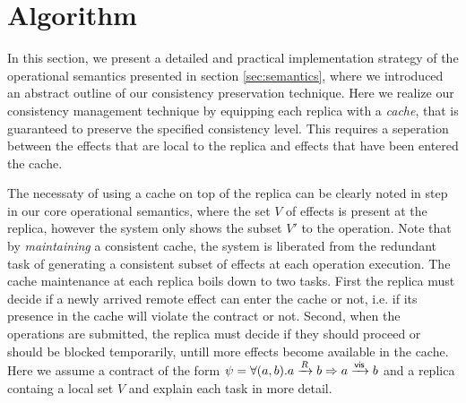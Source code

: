 \section{Algorithm}
%
In this section, we present a detailed and practical implementation
strategy of the operational semantics presented in section \ref{sec:semantics},
where we introduced an abstract outline of our consistency
preservation technique. Here we realize our consistency management technique by equipping 
each replica with a \emph{cache}, that is guaranteed to
preserve the specified consistency level. This requires a seperation
between the effects that are local to the replica and effects that have
been entered the cache. 

The necessaty of using a cache on top of the replica  can be clearly noted 
in \visrule step in our core operational
semantics, where the set $V$ of effects
is present at the replica, however the system only shows the subset $V'$
to the operation. Note
that by \emph{maintaining} a consistent cache, the system is liberated from the
redundant task of generating a consistent subset of effects at each
operation execution.
The cache maintenance at each replica boils down to two tasks. First the
replica must decide if a newly arrived remote effect can enter the
cache or not, i.e. if its presence in the cache will violate the
contract or not.  Second, when the operations are submitted, the replica
must decide if they should proceed or should be blocked temporarily,
untill more effects become available in the cache.  Here we assume a
contract of the form  
$\psi = \forall (a,b). a \xrightarrow{R} b  \Rightarrow a
\xrightarrow{{\normalfont \textsf{vis}}} b$ and a replica containg a local set $V$ and explain each task in more detail.

